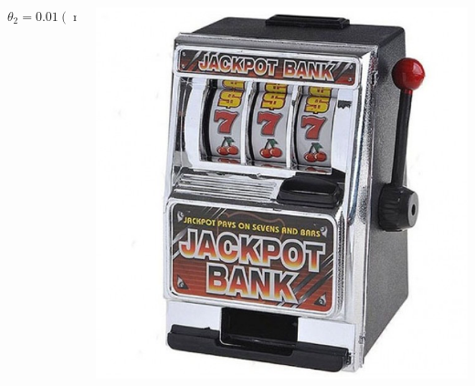 \documentclass[fullscreen=true, bookmarks=true, hyperref={pdfencoding=unicode}]{beamer}
\begin{document}
\begin{frame}
\begin{columns}
\begin{column}{.25\paperwidth}
\begin{center}
          $\theta_2 = 0.01 (\min)$
        \end{center}
      \end{column}
      \begin{column}{.25\paperwidth}
        \begin{center}
          \includegraphics[keepaspectratio,
                           width=.2\paperwidth]{data-kopilkabandit.jpg}


\end{center}
\end{column}
\end{columns}
\end{frame}
\end{document}
